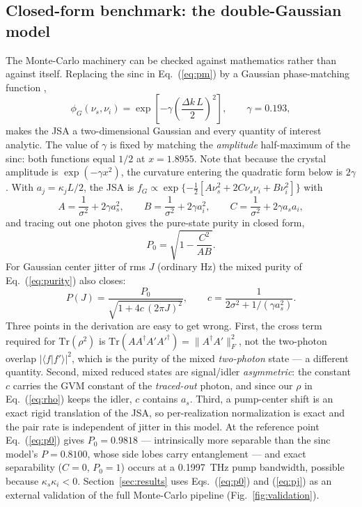 \subsection{Closed-form benchmark: the double-Gaussian model}

The Monte-Carlo machinery can be checked against mathematics rather
than against itself. Replacing the sinc in Eq.~(\ref{eq:pm}) by a
Gaussian phase-matching function \cite{grice1997,graffitti2018},
\begin{equation}
  \phi_G(\nu_s,\nu_i)
  = \exp\!\left[-\gamma \left(\frac{\Delta k\, L}{2}\right)^{\!2}\right],
  \qquad \gamma = 0.193,
  \label{eq:phig}
\end{equation}
makes the JSA a two-dimensional Gaussian and every quantity of
interest analytic. The value of $\gamma$ is fixed by matching the
\emph{amplitude} half-maximum of the sinc: both functions equal $1/2$
at $x = 1.8955$. Note that because the crystal amplitude is
$\exp(-\gamma x^2)$, the curvature entering the quadratic form below
is $2\gamma$. With $a_j = \kappa_j L/2$, the JSA is
$f_G \propto \exp\{-\tfrac{1}{2}[A\nu_s^2 + 2C\nu_s\nu_i +
B\nu_i^2]\}$ with
\[
  A = \frac{1}{\sigma^2} + 2\gamma a_s^2 , \qquad
  B = \frac{1}{\sigma^2} + 2\gamma a_i^2 , \qquad
  C = \frac{1}{\sigma^2} + 2\gamma a_s a_i ,
\]
and tracing out one photon gives the pure-state purity in closed form,
\begin{equation}
  P_0 = \sqrt{1 - \frac{C^2}{A B}} .
  \label{eq:p0}
\end{equation}
For Gaussian center jitter of rms $J$ (ordinary Hz) the mixed purity
of Eq.~(\ref{eq:purity}) also closes:
\begin{equation}
  P(J) = \frac{P_0}{\sqrt{1 + 4 c\,(2\pi J)^2}} ,
  \qquad
  c = \frac{1}{2\sigma^2 + 1/(\gamma a_s^2)} .
  \label{eq:pj}
\end{equation}
Three points in the derivation are easy to get wrong. First, the
cross term required for $\mathrm{Tr}(\rho^2)$ is
$\mathrm{Tr}(A A^\dagger A' A'^\dagger) = \| A^\dagger A' \|_F^2$,
not the two-photon overlap $|\langle f | f' \rangle|^2$, which is the
purity of the mixed \emph{two-photon} state --- a different quantity.
Second, mixed reduced states are signal/idler \emph{asymmetric}: the
constant $c$ carries the GVM constant of the \emph{traced-out} photon,
and since our $\rho$ in Eq.~(\ref{eq:rho}) keeps the idler, $c$
contains $a_s$. Third, a pump-center shift is an exact rigid
translation of the JSA, so per-realization normalization is exact and
the pair rate is independent of jitter in this model. At the reference
point Eq.~(\ref{eq:p0}) gives $P_0 = 0.9818$ --- intrinsically more
separable than the sinc model's $P = 0.8100$, whose side lobes carry
entanglement --- and exact separability ($C = 0$, $P_0 = 1$) occurs at
a 0.1997~THz pump bandwidth, possible because
$\kappa_s \kappa_i < 0$. Section~\ref{sec:results} uses
Eqs.~(\ref{eq:p0}) and (\ref{eq:pj}) as an external validation of the
full Monte-Carlo pipeline (Fig.~\ref{fig:validation}).


